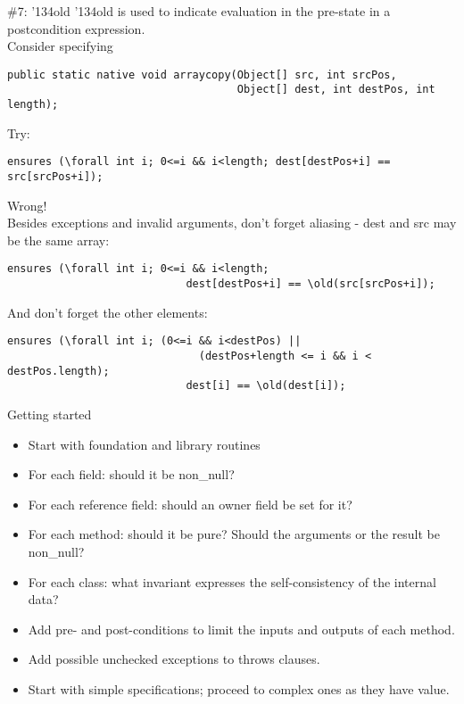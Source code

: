 \documentclass[
pdf,
nocolorBG,
slideColor,
cok,
]{prosper}
\newcommand{\bsl}{\char'134}
\newcommand{\old}{\bsl old}
\begin{document}
\begin{slide}{\#7: \old}
\vspace*{-6ex}
{\knalblue \old} is used to indicate evaluation in the pre-state in a postcondition expression.\\
\vspace{1ex}
Consider specifying
{\tiny
\begin{verbatim} 
public static native void arraycopy(Object[] src, int srcPos,
                                    Object[] dest, int destPos, int length);
\end{verbatim}
}
Try:
{\tiny
\begin{verbatim} 
ensures (\forall int i; 0<=i && i<length; dest[destPos+i] == src[srcPos+i]);
\end{verbatim}
}

{\red
Wrong!}\\
\vspace{1ex}
Besides exceptions and invalid arguments, don't forget aliasing - {\blue dest} and {\blue src} may be the same array:
{\tiny
\begin{verbatim} 
ensures (\forall int i; 0<=i && i<length; 
                            dest[destPos+i] == \old(src[srcPos+i]);
\end{verbatim}
}
And don't forget the other elements:
{\tiny
\begin{verbatim} 
ensures (\forall int i; (0<=i && i<destPos) || 
                              (destPos+length <= i && i < destPos.length); 
                            dest[i] == \old(dest[i]);
\end{verbatim}
}



\end{slide}


\begin{slide}{Getting started}
\vspace*{-6ex}
\begin{itemize}
\item Start with foundation and library routines
\item For each field: should it be {\knalblue non\_null}?
\item For each reference field: should an {\knalblue owner} field be set for it?
\item For each method: should it be {\knalblue pure}?  Should the arguments or the result be {\knalblue non\_null}?
\item For each class: what {\knalblue invariant} expresses the self-consistency of the internal data?
\item Add {\knalblue pre-} and {\knalblue post-conditions} to limit the inputs and outputs of each method.
\item Add possible unchecked {\knalblue exceptions} to throws clauses.
\item Start with simple specifications; proceed to complex ones as they have value.
\end{itemize}

\end{slide}
\end{document}
